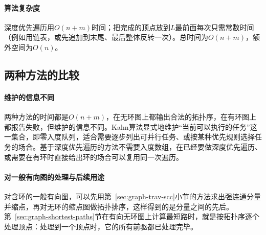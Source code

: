 \paragraph{算法复杂度}
深度优先遍历用$O(n+m)$时间；把完成的顶点放到$L$最前面每次只需常数时间（例如用链表，或先追加到末尾、最后整体反转一次）。总时间为$O(n+m)$，额外空间为$O(n)$。

\subsection{两种方法的比较}
\label{sec:graph-trav-topo-comparison}

\paragraph{维护的信息不同}
两种方法的时间都是$O(n+m)$，在无环图上都输出合法的拓扑序，在有环图上都报告失败，但维护的信息不同。Kahn算法显式地维护“当前可以执行的任务”这一集合，即零入度队列，适合需要逐步列出可并行任务、或按某种优先规则选择任务的场合。基于深度优先遍历的方法不需要入度数组，在已经要做深度优先遍历、或需要在有环时直接给出环的场合可以复用同一次遍历。

\paragraph{对一般有向图的处理与后续用途}
对含环的一般有向图，可以先用第~\ref{sec:graph-trav-scc}小节的方法求出强连通分量并缩点，再对无环的缩点图做拓扑排序，这样得到的是分量之间的先后。第~\ref{sec:graph-shortest-paths}节在有向无环图上计算最短路时，就是按拓扑序逐个处理顶点：处理到一个顶点时，它的所有前驱都已处理完毕。
